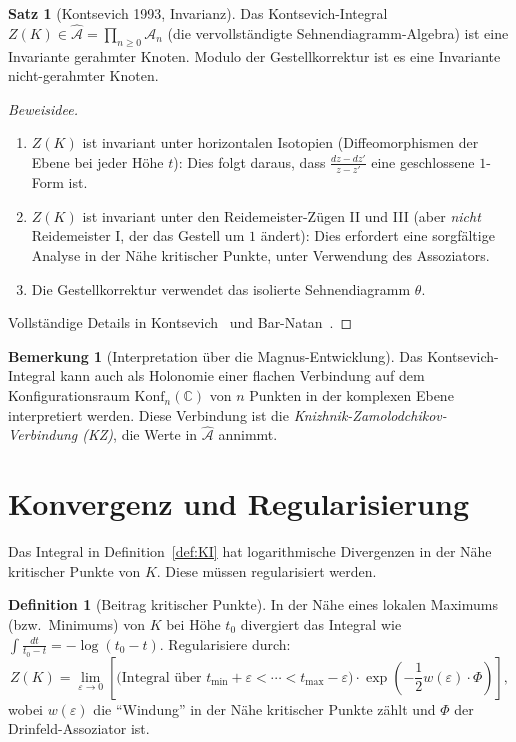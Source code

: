 \documentclass[12pt,a4paper]{amsart}
\theoremstyle{definition}
\newtheorem{satz}[theorem]{Satz}
\newtheorem{bemerkung}[theorem]{Bemerkung}
\newtheorem{definition_de}[theorem]{Definition}
\newcommand{\C}{\mathbb{C}}
\begin{document}
\begin{satz}[Kontsevich 1993, Invarianz]\label{satz:KI_invariant}
Das Kontsevich-Integral $Z(K) \in \hat{\mathcal{A}} = \prod_{n \geq 0} \mathcal{A}_n$
(die vervollständigte Sehnendiagramm-Algebra) ist eine Invariante
gerahmter Knoten.  Modulo der Gestellkorrektur ist es eine Invariante
nicht-gerahmter Knoten.
\end{satz}

\begin{proof}[Beweisidee]
\begin{enumerate}[label=(\arabic*)]
  \item $Z(K)$ ist invariant unter horizontalen Isotopien (Diffeomorphismen
        der Ebene bei jeder Höhe $t$): Dies folgt daraus, dass
        $\frac{dz - dz'}{z - z'}$ eine geschlossene $1$-Form ist.
  \item $Z(K)$ ist invariant unter den Reidemeister-Zügen II und III
        (aber \emph{nicht} Reidemeister I, der das Gestell um $1$ ändert):
        Dies erfordert eine sorgfältige Analyse in der Nähe kritischer Punkte,
        unter Verwendung des Assoziators.
  \item Die Gestellkorrektur verwendet das isolierte Sehnendiagramm $\theta$.
\end{enumerate}
Vollständige Details in Kontsevich~\cite{kontsevich1993} und
Bar-Natan~\cite{barnatan1995}.
\end{proof}

\begin{bemerkung}[Interpretation über die Magnus-Entwicklung]
Das Kontsevich-Integral kann auch als Holonomie einer flachen Verbindung
auf dem Konfigurationsraum $\mathrm{Konf}_n(\C)$ von $n$ Punkten in der
komplexen Ebene interpretiert werden.  Diese Verbindung ist die
\emph{Knizhnik-Zamolodchikov-Verbindung (KZ)}, die Werte in $\hat{\mathcal{A}}$
annimmt.
\end{bemerkung}

\section{Konvergenz und Regularisierung}\label{sec:konvergenz}

Das Integral in Definition~\ref{def:KI} hat logarithmische Divergenzen
in der Nähe kritischer Punkte von $K$.  Diese müssen regularisiert werden.

\begin{definition_de}[Beitrag kritischer Punkte]
In der Nähe eines lokalen Maximums (bzw.\ Minimums) von $K$ bei Höhe $t_0$
divergiert das Integral wie $\int \frac{dt}{t_0 - t} = -\log(t_0 - t)$.
Regularisiere durch:
\[
  Z(K) = \lim_{\varepsilon \to 0} \left[
    \text{(Integral über } t_{\min}+\varepsilon < \cdots < t_{\max}-\varepsilon)
    \cdot \exp\!\left(-\frac{1}{2} w(\varepsilon) \cdot \Phi\right)
  \right],
\]
wobei $w(\varepsilon)$ die ``Windung'' in der Nähe kritischer Punkte zählt
und $\Phi$ der Drinfeld-Assoziator ist.
\end{definition_de}
\end{document}
